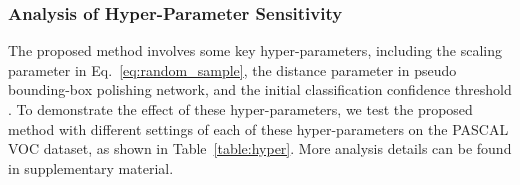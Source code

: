 \documentclass[letterpaper]{article} \usepackage{aaai23}  \usepackage{times}  \usepackage{helvet}  \usepackage{courier}  \usepackage[hyphens]{url}  \usepackage{graphicx} \urlstyle{rm} \def\UrlFont{\rm}  \usepackage{natbib}  \usepackage{caption} \frenchspacing  \setlength{\pdfpagewidth}{8.5in}  \setlength{\pdfpageheight}{11in}  \usepackage{algorithm}
\begin{document}
\begin{table}[h!]  
\caption{Effect of different hyperparameters}\label{table:hyper}
\centering
{}
\end{table}


\subsubsection{\textbf{Analysis of Hyper-Parameter Sensitivity}}
The proposed method involves some key hyper-parameters, including the scaling parameter  in Eq.~\eqref{eq:random_sample}, the distance parameter  in pseudo bounding-box polishing network, and the initial classification confidence threshold . To demonstrate the effect of these hyper-parameters, we test the proposed method with different settings of each of these hyper-parameters on the PASCAL VOC dataset, as shown in Table~\ref{table:hyper}. More analysis details can be found in supplementary material. 
\end{document}
